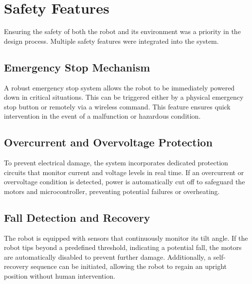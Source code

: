 \section{Safety Features}
Ensuring the safety of both the robot and its environment was a priority in the design process. Multiple safety features were integrated into the system.

\subsection{Emergency Stop Mechanism}
A robust emergency stop system allows the robot to be immediately powered down in critical situations. This can be triggered either by a physical emergency stop button or remotely via a wireless command. This feature ensures quick intervention in the event of a malfunction or hazardous condition.

\subsection{Overcurrent and Overvoltage Protection}
To prevent electrical damage, the system incorporates dedicated protection circuits that monitor current and voltage levels in real time. If an overcurrent or overvoltage condition is detected, power is automatically cut off to safeguard the motors and microcontroller, preventing potential failures or overheating.

\subsection{Fall Detection and Recovery}
The robot is equipped with sensors that continuously monitor its tilt angle. If the robot tips beyond a predefined threshold, indicating a potential fall, the motors are automatically disabled to prevent further damage. Additionally, a self-recovery sequence can be initiated, allowing the robot to regain an upright position without human intervention.